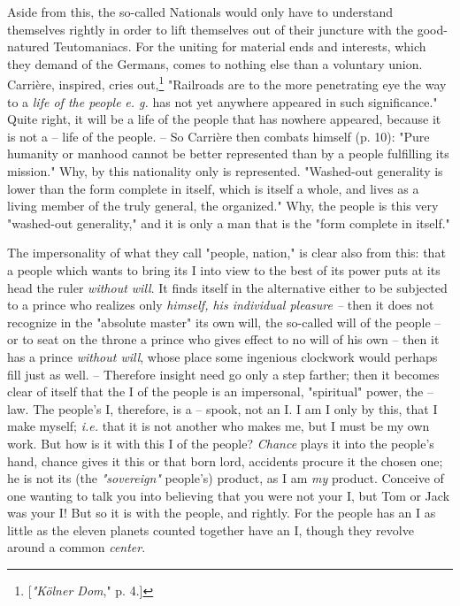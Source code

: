 Aside from this, the so-called Nationals would only have to understand 
themselves rightly in order to lift themselves out of their juncture with the 
good-natured Teutomaniacs. For the uniting for material ends and interests, 
which they demand of the Germans, comes to nothing else than a voluntary 
union. Carri\`ere, inspired, cries out,\footnote{[\textit{"{}K\"olner Dom},"{} 
p. 4.]} "{}Railroads are to the more penetrating eye the way to a \textit{life 
of the people} \textit{e. g.} has not yet anywhere appeared in such 
significance."{} Quite right, it will be a life of the people that has nowhere 
appeared, because it is not a -- life of the people. -- So Carri\`ere then 
combats himself (p. 10): "{}Pure humanity or manhood cannot be better 
represented than by a people fulfilling its mission."{} Why, by this 
nationality only is represented. "{}Washed-out generality is lower than the 
form complete in itself, which is itself a whole, and lives as a living member 
of the truly general, the organized."{} Why, the people is this very 
"{}washed-out generality,"{} and it is only a man that is the "{}form complete 
in itself."{}

The impersonality of what they call "{}people, nation,"{} is clear also from 
this: that a people which wants to bring its I into view to the best of its 
power puts at its head the ruler \textit{without will}. It finds itself in the 
alternative either to be subjected to a prince who realizes only 
\textit{himself, his individual pleasure --} then it does not recognize in the 
"{}absolute master"{} its own will, the so-called will of the people -- or to 
seat on the throne a prince who gives effect to no will of his own -- then it 
has a prince \textit{without will}, whose place some ingenious clockwork would 
perhaps fill just as well. -- Therefore insight need go only a step farther; 
then it becomes clear of itself that the I of the people is an impersonal, 
"{}spiritual"{} power, the -- law. The people's I, therefore, is a -- spook, 
not an I. I am I only by this, that I make myself; \textit{i.e.} that it is 
not another who makes me, but I must be my own work. But how is it with this I 
of the people? \textit{Chance} plays it into the people's hand, chance gives 
it this or that born lord, accidents procure it the chosen one; he is not its 
(the \textit{"{}sovereign"{}} people's) product, as I am \textit{my} product. 
Conceive of one wanting to talk you into believing that you were not your I, 
but Tom or Jack was your I! But so it is with the people, and rightly. For the 
people has an I as little as the eleven planets counted together have an I, 
though they revolve around a common \textit{center}.


